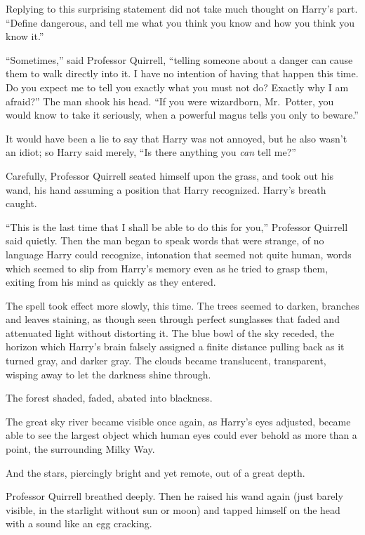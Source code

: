 Replying to this surprising statement did not take much thought on
Harry's part. ``Define dangerous, and tell me what you think you know
and how you think you know it.''

``Sometimes,'' said Professor Quirrell, ``telling someone about a danger
can cause them to walk directly into it. I have no intention of having
that happen this time. Do you expect me to tell you exactly what you
must not do? Exactly why I am afraid?'' The man shook his head. ``If you
were wizardborn, Mr.~Potter, you would know to take it seriously, when a
powerful magus tells you only to beware.''

It would have been a lie to say that Harry was not annoyed, but he also
wasn't an idiot; so Harry said merely, ``Is there anything you
\emph{can} tell me?''

Carefully, Professor Quirrell seated himself upon the grass, and took
out his wand, his hand assuming a position that Harry recognized.
Harry's breath caught.

``This is the last time that I shall be able to do this for you,''
Professor Quirrell said quietly. Then the man began to speak words that
were strange, of no language Harry could recognize, intonation that
seemed not quite human, words which seemed to slip from Harry's memory
even as he tried to grasp them, exiting from his mind as quickly as they
entered.

The spell took effect more slowly, this time. The trees seemed to
darken, branches and leaves staining, as though seen through perfect
sunglasses that faded and attenuated light without distorting it. The
blue bowl of the sky receded, the horizon which Harry's brain falsely
assigned a finite distance pulling back as it turned gray, and darker
gray. The clouds became translucent, transparent, wisping away to let
the darkness shine through.

The forest shaded, faded, abated into blackness.

The great sky river became visible once again, as Harry's eyes adjusted,
became able to see the largest object which human eyes could ever behold
as more than a point, the surrounding Milky Way.

And the stars, piercingly bright and yet remote, out of a great depth.

Professor Quirrell breathed deeply. Then he raised his wand again (just
barely visible, in the starlight without sun or moon) and tapped himself
on the head with a sound like an egg cracking.

